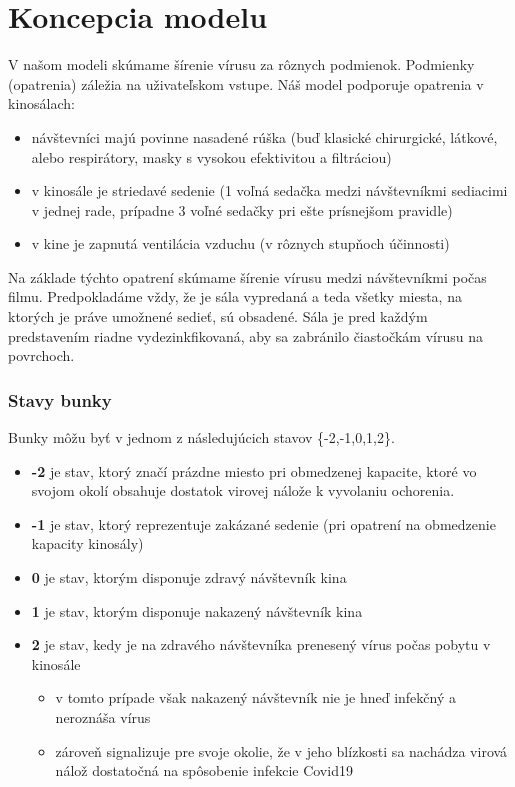 \documentclass[a4paper, 11pt]{article}
\begin{document}
    \section{Koncepcia modelu}
    V našom modeli skúmame šírenie vírusu za rôznych podmienok. Podmienky (opatrenia) záležia na uživateľskom vstupe. Náš model podporuje opatrenia v kinosálach: 
        \begin{itemize}
            \item návštevníci majú povinne nasadené rúška (buď klasické chirurgické, látkové, alebo respirátory, masky s vysokou efektivitou a filtráciou)
            \item v kinosále je striedavé sedenie (1 voľná sedačka medzi návštevníkmi sediacimi v jednej rade, prípadne 3 voľné sedačky pri ešte prísnejšom pravidle)
            \item v kine je zapnutá ventilácia vzduchu (v rôznych stupňoch účinnosti)
        \end{itemize}
    Na základe týchto opatrení skúmame šírenie vírusu medzi návštevníkmi počas filmu. Predpokladáme vždy, že je sála vypredaná a teda všetky miesta, na ktorých je práve umožnené sedieť, sú obsadené. Sála je pred každým predstavením riadne vydezinkfikovaná, aby sa zabránilo čiastočkám vírusu na povrchoch.
    
        \subsubsection{Stavy bunky}
        Bunky môžu byť v jednom z následujúcich stavov \{-2,-1,0,1,2\}.
        \begin{itemize}
            \item \textbf{-2} je stav, ktorý značí prázdne miesto pri obmedzenej kapacite, ktoré vo svojom okolí obsahuje dostatok virovej nálože k vyvolaniu ochorenia.
            \item \textbf{-1} je stav, ktorý reprezentuje zakázané sedenie (pri opatrení na obmedzenie kapacity kinosály)
            \item \textbf{0} je stav, ktorým disponuje zdravý návštevník kina
            \item \textbf{1} je stav, ktorým disponuje nakazený návštevník kina
            \item \textbf{2} je stav, kedy je na zdravého návštevníka prenesený vírus počas pobytu v kinosále
            \begin{itemize}
                \item v tomto prípade však nakazený návštevník nie je hneď infekčný a neroznáša vírus
                \item zároveň signalizuje pre svoje okolie, že v jeho blízkosti sa nachádza virová nálož dostatočná na spôsobenie infekcie Covid19 
            \end{itemize}
        \end{itemize}
        
\end{document}
